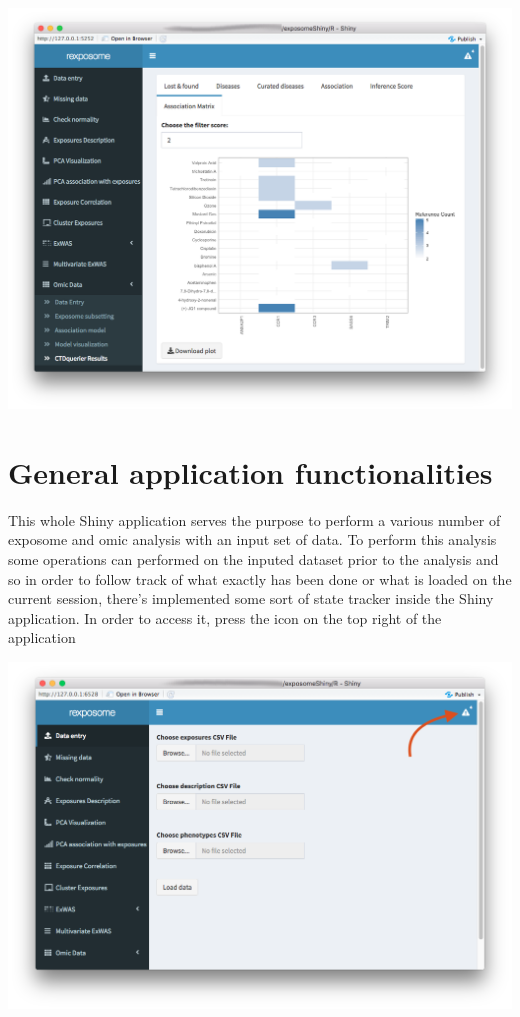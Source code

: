 \documentclass[
]{book}
\begin{document}
\includegraphics{images/analysis10_9.png}

\hypertarget{general-application-functionalities}{%
\chapter{General application functionalities}\label{general-application-functionalities}}

This whole Shiny application serves the purpose to perform a various number of exposome and omic analysis with an input set of data. To perform this analysis some operations can performed on the inputed dataset prior to the analysis and so in order to follow track of what exactly has been done or what is loaded on the current session, there's implemented some sort of state tracker inside the Shiny application. In order to access it, press the icon on the top right of the application

\includegraphics{images/general1.png}
\end{document}
